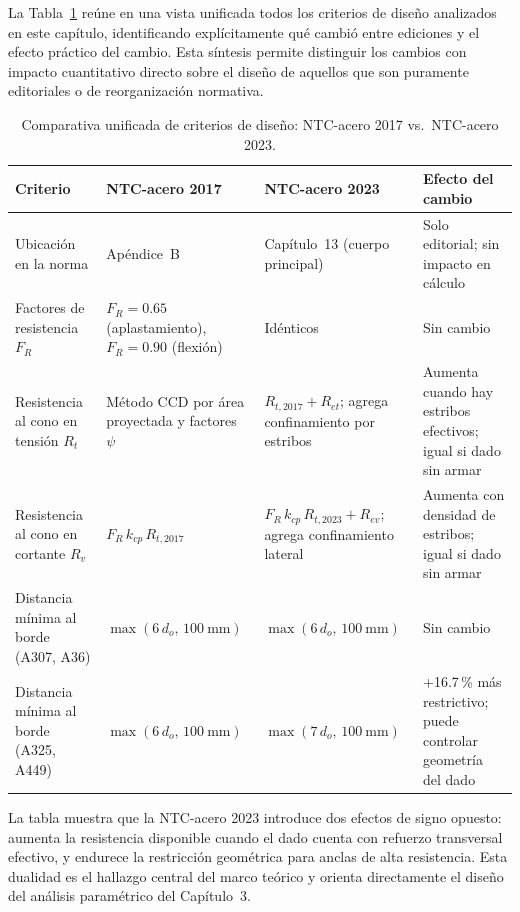 La Tabla~\ref{tab:comparativa_normas} reúne en una vista unificada todos los criterios de diseño
analizados en este capítulo, identificando explícitamente qué cambió entre ediciones y el efecto
práctico del cambio. Esta síntesis permite distinguir los cambios con impacto cuantitativo directo
sobre el diseño de aquellos que son puramente editoriales o de reorganización normativa.

\begin{table}[H]
  \centering
  \small
  \caption{Comparativa unificada de criterios de diseño: NTC-acero 2017 vs.\ NTC-acero 2023.}
  \label{tab:comparativa_normas}
  \begin{tabular}{p{} p{} p{} p{}}
    \toprule
    \textbf{Criterio} & \textbf{NTC-acero 2017} & \textbf{NTC-acero 2023} & \textbf{Efecto del cambio} \\
    \midrule
    Ubicación en la norma
      & Apéndice~B
      & Capítulo~13 (cuerpo principal)
      & Solo editorial; sin impacto en cálculo \\
    \addlinespace
    Factores de resistencia $F_R$
      & $F_R=0.65$ (aplastamiento), $F_R=0.90$ (flexión)
      & Idénticos
      & Sin cambio \\
    \addlinespace
    Resistencia al cono en tensión $R_t$
      & Método CCD por área proyectada y factores $\psi$
      & $R_{t,2017} + R_{et}$; agrega confinamiento por estribos
      & Aumenta cuando hay estribos efectivos; igual si dado sin armar \\
    \addlinespace
    Resistencia al cono en cortante $R_v$
      & $F_R\,k_{cp}\,R_{t,2017}$
      & $F_R\,k_{cp}\,R_{t,2023} + R_{ev}$; agrega confinamiento lateral
      & Aumenta con densidad de estribos; igual si dado sin armar \\
    \addlinespace
    Distancia mínima al borde (A307, A36)
      & $\max(6\,d_o,\,100~\text{mm})$
      & $\max(6\,d_o,\,100~\text{mm})$
      & Sin cambio \\
    \addlinespace
    Distancia mínima al borde (A325, A449)
      & $\max(6\,d_o,\,100~\text{mm})$
      & $\max(7\,d_o,\,100~\text{mm})$
      & +16.7\,\% más restrictivo; puede controlar geometría del dado \\
    \bottomrule
  \end{tabular}
\end{table}

La tabla muestra que la NTC-acero 2023 introduce dos efectos de signo opuesto: aumenta la
resistencia disponible cuando el dado cuenta con refuerzo transversal efectivo, y endurece la
restricción geométrica para anclas de alta resistencia. Esta dualidad es el hallazgo central del
marco teórico y orienta directamente el diseño del análisis paramétrico del Capítulo~3.
